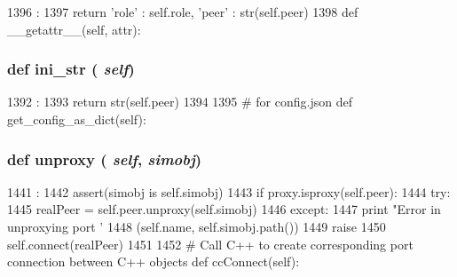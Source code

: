 \begin{DoxyCode}
1396                                 :
1397         return {'role' : self.role, 'peer' : str(self.peer)}
1398 
    def __getattr__(self, attr):
\end{DoxyCode}
\hypertarget{classm5_1_1params_1_1PortRef_a33ebe6cd32bcbd15465fc28b9d94bf82}{
\subsubsection[{ini\_\-str}]{\setlength{\rightskip}{0pt plus 5cm}def ini\_\-str ( {\em self})}}
\label{classm5_1_1params_1_1PortRef_a33ebe6cd32bcbd15465fc28b9d94bf82}



\begin{DoxyCode}
1392                      :
1393         return str(self.peer)
1394 
1395     # for config.json
    def get_config_as_dict(self):
\end{DoxyCode}
\hypertarget{classm5_1_1params_1_1PortRef_a587cd3c1e899640dc09d63793aa8093b}{
\subsubsection[{unproxy}]{\setlength{\rightskip}{0pt plus 5cm}def unproxy ( {\em self}, \/   {\em simobj})}}
\label{classm5_1_1params_1_1PortRef_a587cd3c1e899640dc09d63793aa8093b}



\begin{DoxyCode}
1441                              :
1442         assert(simobj is self.simobj)
1443         if proxy.isproxy(self.peer):
1444             try:
1445                 realPeer = self.peer.unproxy(self.simobj)
1446             except:
1447                 print "Error in unproxying port '%
1448                       (self.name, self.simobj.path())
1449                 raise
1450             self.connect(realPeer)
1451 
1452     # Call C++ to create corresponding port connection between C++ objects
    def ccConnect(self):
\end{DoxyCode}


